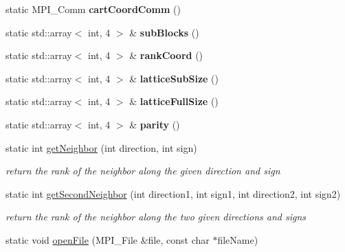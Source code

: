 \begin{DoxyCompactItemize}
\item 
static M\+P\+I\+\_\+\+Comm {\bfseries cart\+Coord\+Comm} ()\hypertarget{classParallel_a127b363a07b22186627f532b2ab04c28}{}\label{classParallel_a127b363a07b22186627f532b2ab04c28}

\item 
static std\+::array$<$ int, 4 $>$ \& {\bfseries sub\+Blocks} ()\hypertarget{classParallel_ad237dc02b7a88cfc454b5a87573588ea}{}\label{classParallel_ad237dc02b7a88cfc454b5a87573588ea}

\item 
static std\+::array$<$ int, 4 $>$ \& {\bfseries rank\+Coord} ()\hypertarget{classParallel_a64dc2b62abe04ae4eeb2c55f9407b9dd}{}\label{classParallel_a64dc2b62abe04ae4eeb2c55f9407b9dd}

\item 
static std\+::array$<$ int, 4 $>$ \& {\bfseries lattice\+Sub\+Size} ()\hypertarget{classParallel_addeb93b221ca944c1916033f8ac5144e}{}\label{classParallel_addeb93b221ca944c1916033f8ac5144e}

\item 
static std\+::array$<$ int, 4 $>$ \& {\bfseries lattice\+Full\+Size} ()\hypertarget{classParallel_a5e2b7f890813ffc45221d92aee3e51bd}{}\label{classParallel_a5e2b7f890813ffc45221d92aee3e51bd}

\item 
static std\+::array$<$ int, 4 $>$ \& {\bfseries parity} ()\hypertarget{classParallel_ae4d683542868851b8d8229493c0fa412}{}\label{classParallel_ae4d683542868851b8d8229493c0fa412}

\item 
static int \hyperlink{classParallel_a4e99d3605b17fb51fa8a566cf0730179}{get\+Neighbor} (int direction, int sign)\hypertarget{classParallel_a4e99d3605b17fb51fa8a566cf0730179}{}\label{classParallel_a4e99d3605b17fb51fa8a566cf0730179}

\begin{DoxyCompactList}\small\item\em return the rank of the neighbor along the given direction and sign \end{DoxyCompactList}\item 
static int \hyperlink{classParallel_afaecf8622c16bb5def671d881821db7d}{get\+Second\+Neighbor} (int direction1, int sign1, int direction2, int sign2)\hypertarget{classParallel_afaecf8622c16bb5def671d881821db7d}{}\label{classParallel_afaecf8622c16bb5def671d881821db7d}

\begin{DoxyCompactList}\small\item\em return the rank of the neighbor along the two given directions and signs \end{DoxyCompactList}\item 
static void \hyperlink{classParallel_afea26fc4854070b69224b42962b13091}{open\+File} (M\+P\+I\+\_\+\+File \&file, const char $\ast$file\+Name)\hypertarget{classParallel_afea26fc4854070b69224b42962b13091}{}\label{classParallel_afea26fc4854070b69224b42962b13091}


\end{DoxyCompactItemize}
